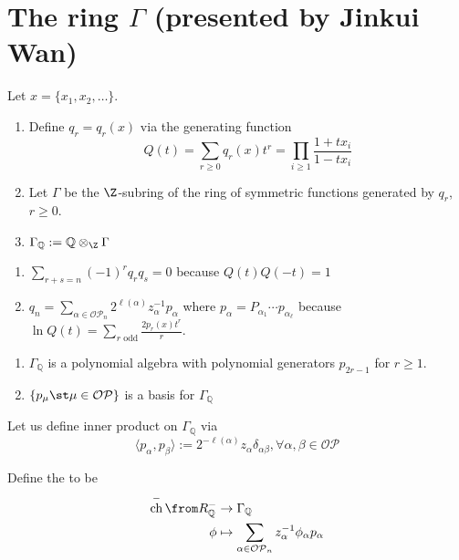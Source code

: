 \documentclass[11pt,leqno,oneside]{amsbook}
\newcommand{\OP}{\mathcal{OP}} %
\DeclareMathOperator{\ch}{ch}
\numberwithin{thm}{section}
\begin{document}
\section{The ring \(\Gamma\) (presented by Jinkui Wan)}
\begin{defn}
  Let \(x = \{x_1, x_2, \ldots\}\).
  \begin{enumerate}
  \item Define \(q_r = q_r(x)\) via the generating function
    \[ Q(t) = \sum_{r \geq 0} q_r(x) t^r = \prod_{i \geq 1}
      \frac{1+tx_i}{1-tx_i}
    \]
  \item Let \(\Gamma\) be the \(\Z\)-subring of the ring of symmetric
    functions generated by \(q_r\), \(r \geq 0\).
  \item \(\Gamma_{\mathbb{Q}} := \mathbb{Q} \otimes_\Z \Gamma\)
  \end{enumerate}
\end{defn}
\begin{prop}
  \begin{enumerate}
  \item \(\sum_{r+s=n} (-1)^r q_r q_s = 0\) because \(Q(t)Q(-t) = 1\)
  \item \(q_n = \sum_{\alpha \in \OP_n} 2^{\ell(\alpha)} z_\alpha^{-1}
    p_\alpha\) where \(p_\alpha = P_{\alpha_1} \cdots
    p_{\alpha_\ell}\) because \(\ln Q(t) = \sum_{r \text{ odd}}
    \frac{2 p_r(x) t^r}{r}\).
  \end{enumerate}
\end{prop}
\begin{thm}
  \begin{enumerate}
  \item \(\Gamma_{\mathbb{Q}}\) is a polynomial algebra with
    polynomial generators \(p_{2r-1}\) for \(r \geq 1\).
  \item \(\{p_\mu \st \mu \in \OP\}\) is a basis for \(\Gamma_{\mathbb{Q}}\)
  \end{enumerate}
\end{thm}
\begin{defn}
  Let us define inner product on \(\Gamma_{\mathbb{Q}}\) via \[
    \langle p_\alpha, p_\beta \rangle := 2^{-\ell(\alpha)} z_\alpha
    \delta_{\alpha \beta}, \forall \alpha, \beta \in \OP
  \]
\end{defn}
\begin{defn}
  Define the  to be
  \begin{align*}
    \ch^- \from R_{\mathbb{Q}}^- & \to \Gamma_{\mathbb{Q}}\\
    \phi & \mapsto \sum_{\alpha \in \OP_n} z_\alpha^{-1} \phi_\alpha
           p_\alpha 
  \end{align*}
\end{defn}
\end{document}
